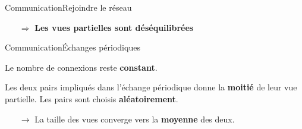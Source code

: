 \begin{frame}{Communication}{Rejoindre le réseau}
  \vspace{1cm}
  
  \large
  \begin{itemize}
  \item [$\Rightarrow$] \textbf{Les vues partielles sont déséquilibrées}
  \end{itemize}

\end{frame}

\begin{frame}{Communication}{Échanges périodiques}
 
  Le nombre de connexions reste \textbf{constant}.
 
  \vspace{0.5cm}

  Les deux pairs impliqués dans l'échange périodique donne la \textbf{moitié} de
  leur vue partielle. Les pairs sont choisis \textbf{aléatoirement}.
  \begin{itemize}
  \item [$\rightarrow$] La taille des vues converge vers la \textbf{moyenne} des
    deux.
  \end{itemize}
  

  \vspace{0.5cm}\hspace{-1cm}
  \begin{minipage}{0.32\textwidth}
    \begin{center}
      
    \end{center}
  \end{minipage}
  \hspace{0.35cm}
  \begin{minipage}{0.32\textwidth}
    \begin{center}
      
    \end{center}
  \end{minipage}
  \hspace{0.35cm}
  \begin{minipage}{0.32\textwidth}
    \begin{center}
      
    \end{center}
  \end{minipage}




\end{frame}
